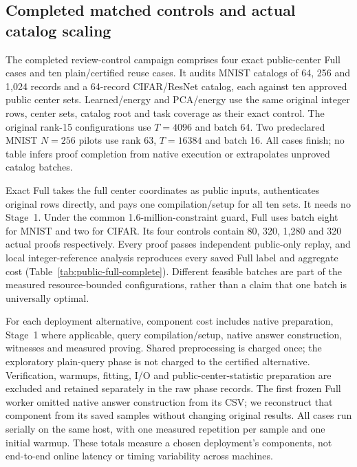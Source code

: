 \subsection{Completed matched controls and actual catalog scaling}\label{sec:review-controls}
The completed review-control campaign comprises four exact public-center Full cases and ten plain/certified reuse cases. It audits MNIST catalogs of 64, 256 and 1,024 records and a 64-record CIFAR/ResNet catalog, each against ten approved public center sets. Learned/energy and PCA/energy use the same original integer rows, center sets, catalog root and task coverage as their exact control. The original rank-15 configurations use $T=4096$ and batch 64. Two predeclared MNIST $N=256$ pilots use rank 63, $T=16384$ and batch 16. All cases finish; no table infers proof completion from native execution or extrapolates unproved catalog batches.

Exact Full takes the full center coordinates as public inputs, authenticates original rows directly, and pays one compilation/setup for all ten sets. It needs no Stage~1. Under the common 1.6-million-constraint guard, Full uses batch eight for MNIST and two for CIFAR. Its four controls contain 80, 320, 1,280 and 320 actual proofs respectively. Every proof passes independent public-only replay, and local integer-reference analysis reproduces every saved Full label and aggregate cost (Table~\ref{tab:public-full-complete}). Different feasible batches are part of the measured resource-bounded configurations, rather than a claim that one batch is universally optimal.


For each deployment alternative, component cost includes native preparation, Stage~1 where applicable, query compilation/setup, native answer construction, witnesses and measured proving. Shared preprocessing is charged once; the exploratory plain-query phase is not charged to the certified alternative. Verification, warmups, fitting, I/O and public-center-statistic preparation are excluded and retained separately in the raw phase records. The first frozen Full worker omitted native answer construction from its CSV; we reconstruct that component from its saved samples without changing original results. All cases run serially on the same host, with one measured repetition per sample and one initial warmup. These totals measure a chosen deployment's components, not end-to-end online latency or timing variability across machines.


